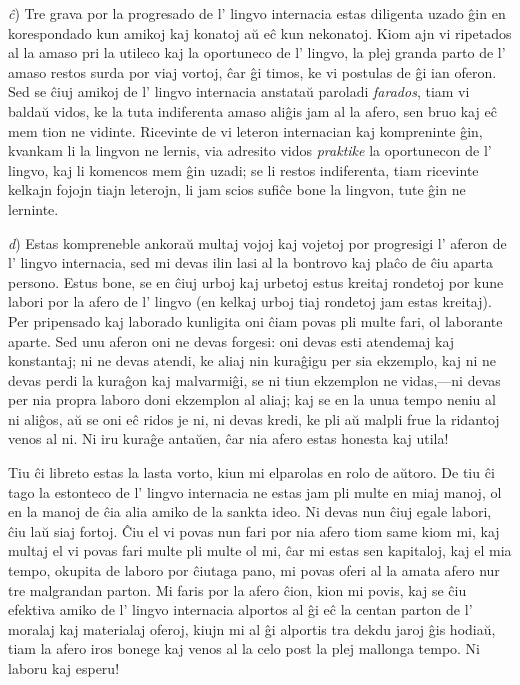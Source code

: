 \documentclass[12pt,twoside]{book}
\begin{document}
\emph{ĉ}) Tre grava por la progresado de l' lingvo internacia estas diligenta uzado ĝin en korespondado kun amikoj kaj konatoj aŭ eĉ kun nekonatoj. Kiom ajn vi ripetados al la amaso pri la utileco kaj la oportuneco de l' lingvo, la plej granda parto de l' amaso restos surda por viaj vortoj, ĉar ĝi timos, ke vi postulas de ĝi ian oferon. Sed se ĉiuj amikoj de l' lingvo internacia anstataŭ paroladi \emph{farados}, tiam vi baldaŭ vidos, ke la tuta indiferenta amaso aliĝis jam al la afero, sen bruo kaj eĉ mem tion ne vidinte. Ricevinte de vi leteron internacian kaj kompreninte ĝin, kvankam li la lingvon ne lernis, via adresito vidos \emph{praktike} la oportunecon de l' lingvo, kaj li komencos mem ĝin uzadi; se li restos indiferenta, tiam ricevinte kelkajn fojojn tiajn leterojn, li jam scios sufiĉe bone la lingvon, tute ĝin ne lerninte.

\emph{d}) Estas kompreneble ankoraŭ multaj vojoj kaj vojetoj por progresigi l' aferon de l' lingvo internacia, sed mi devas ilin lasi al la bontrovo kaj plaĉo de ĉiu aparta persono. Estus bone, se en ĉiuj urboj kaj urbetoj estus kreitaj rondetoj por kune labori por la afero de l' lingvo (en kelkaj urboj tiaj rondetoj jam estas kreitaj). Per pripensado kaj laborado kunligita oni ĉiam povas pli multe fari, ol laborante aparte. Sed unu aferon oni ne devas forgesi: oni devas esti atendemaj kaj konstantaj; ni ne devas atendi, ke aliaj nin kuraĝigu per sia ekzemplo, kaj ni ne devas perdi la kuraĝon kaj malvarmiĝi, se ni tiun ekzemplon ne vidas,—ni devas per nia propra laboro doni ekzemplon al aliaj; kaj se en la unua tempo neniu al ni aliĝos, aŭ se oni eĉ ridos je ni, ni devas kredi, ke pli aŭ malpli frue la ridantoj venos al ni. Ni iru kuraĝe antaŭen, ĉar nia afero estas honesta kaj utila!

\begin{center}
\end{center}

Tiu ĉi libreto estas la lasta vorto, kiun mi elparolas en rolo de aŭtoro. De tiu ĉi tago la estonteco de l' lingvo internacia ne estas jam pli multe en miaj manoj, ol en la manoj de ĉia alia amiko de la sankta ideo. Ni devas nun ĉiuj egale labori, ĉiu laŭ siaj fortoj. Ĉiu el vi povas nun fari por nia afero tiom same kiom mi, kaj multaj el vi povas fari multe pli multe ol mi, ĉar mi estas sen kapitaloj, kaj el mia tempo, okupita de laboro por ĉiutaga pano, mi povas oferi al la amata afero nur tre malgrandan parton. Mi faris por la afero ĉion, kion mi povis, kaj se ĉiu efektiva amiko de l' lingvo internacia alportos al ĝi eĉ la centan parton de l' moralaj kaj materialaj oferoj, kiujn mi al ĝi alportis tra dekdu jaroj ĝis hodiaŭ, tiam la afero iros bonege kaj venos al la celo post la plej mallonga tempo. Ni laboru kaj esperu!
\end{document}
